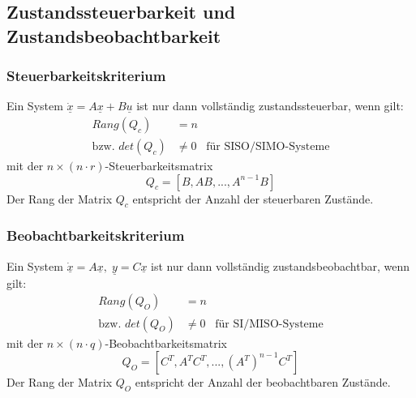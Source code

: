 \documentclass[a4paper,twocolumn,10pt]{article}
\begin{document}
\subsection{Zustandssteuerbarkeit und Zustandsbeobachtbarkeit}

\subsubsection{Steuerbarkeitskriterium}
Ein System $\underline{\dot{x}}=A\underline{x}+B\underline{u}$ ist nur dann vollständig zustandssteuerbar, wenn gilt:
\begin{equation*}
\begin{split}
Rang(Q_c)&=n\\
\text{bzw. }det(Q_c)&\neq 0\;\;\;\text{für SISO/SIMO-Systeme}
\end{split}
\end{equation*}
mit der $n\times (n\cdot r)$-Steuerbarkeitsmatrix
\begin{equation*}
Q_c=[B,AB,...,A^{n-1}B]
\end{equation*}
Der Rang der Matrix $Q_c$ entspricht der Anzahl der steuerbaren Zustände.

\subsubsection{Beobachtbarkeitskriterium}
Ein System $\underline{\dot{x}}=A\underline{x},\;\underline{y}=C\underline{x}$ ist nur dann vollständig zustandsbeobachtbar, wenn gilt:
\begin{equation*}
\begin{split}
Rang(Q_O)&=n\\
\text{bzw. }det(Q_O)&\neq 0\;\;\;\text{für SI/MISO-Systeme}
\end{split}
\end{equation*}
mit der $n\times (n\cdot q)$-Beobachtbarkeitsmatrix
\begin{equation*}
Q_O=[C^T,A^TC^T,...,(A^T)^{n-1}C^T]
\end{equation*}
Der Rang der Matrix $Q_O$ entspricht der Anzahl der beobachtbaren Zustände.
\end{document}
